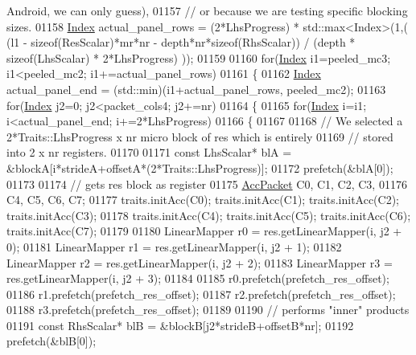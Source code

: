 \begin{DoxyCode}
{       Android, we can only guess),}
01157       \textcolor{comment}{// or because we are testing specific blocking sizes.}
01158       \hyperlink{namespace_eigen_a62e77e0933482dafde8fe197d9a2cfde}{Index} actual\_panel\_rows = (2*LhsProgress) * std::max<Index>(1,( (l1 - \textcolor{keyword}{sizeof}(ResScalar)*mr*nr - 
      depth*nr*\textcolor{keyword}{sizeof}(RhsScalar)) / (depth * \textcolor{keyword}{sizeof}(LhsScalar) * 2*LhsProgress) ));
01159 
01160       \textcolor{keywordflow}{for}(\hyperlink{namespace_eigen_a62e77e0933482dafde8fe197d9a2cfde}{Index} i1=peeled\_mc3; i1<peeled\_mc2; i1+=actual\_panel\_rows)
01161       \{
01162         \hyperlink{namespace_eigen_a62e77e0933482dafde8fe197d9a2cfde}{Index} actual\_panel\_end = (std::min)(i1+actual\_panel\_rows, peeled\_mc2);
01163         \textcolor{keywordflow}{for}(\hyperlink{namespace_eigen_a62e77e0933482dafde8fe197d9a2cfde}{Index} j2=0; j2<packet\_cols4; j2+=nr)
01164         \{
01165           \textcolor{keywordflow}{for}(\hyperlink{namespace_eigen_a62e77e0933482dafde8fe197d9a2cfde}{Index} i=i1; i<actual\_panel\_end; i+=2*LhsProgress)
01166           \{
01167           
01168           \textcolor{comment}{// We selected a 2*Traits::LhsProgress x nr micro block of res which is entirely}
01169           \textcolor{comment}{// stored into 2 x nr registers.}
01170           
01171           \textcolor{keyword}{const} LhsScalar* blA = &blockA[i*strideA+offsetA*(2*Traits::LhsProgress)];
01172           prefetch(&blA[0]);
01173 
01174           \textcolor{comment}{// gets res block as register}
01175           \hyperlink{class_eigen_1_1internal_1_1_tensor_lazy_evaluator_writable}{AccPacket} C0, C1, C2, C3,
01176                     C4, C5, C6, C7;
01177           traits.initAcc(C0); traits.initAcc(C1); traits.initAcc(C2); traits.initAcc(C3);
01178           traits.initAcc(C4); traits.initAcc(C5); traits.initAcc(C6); traits.initAcc(C7);
01179 
01180           LinearMapper r0 = res.getLinearMapper(i, j2 + 0);
01181           LinearMapper r1 = res.getLinearMapper(i, j2 + 1);
01182           LinearMapper r2 = res.getLinearMapper(i, j2 + 2);
01183           LinearMapper r3 = res.getLinearMapper(i, j2 + 3);
01184 
01185           r0.prefetch(prefetch\_res\_offset);
01186           r1.prefetch(prefetch\_res\_offset);
01187           r2.prefetch(prefetch\_res\_offset);
01188           r3.prefetch(prefetch\_res\_offset);
01189 
01190           \textcolor{comment}{// performs "inner" products}
01191           \textcolor{keyword}{const} RhsScalar* blB = &blockB[j2*strideB+offsetB*nr];
01192           prefetch(&blB[0]);

\end{DoxyCode}
